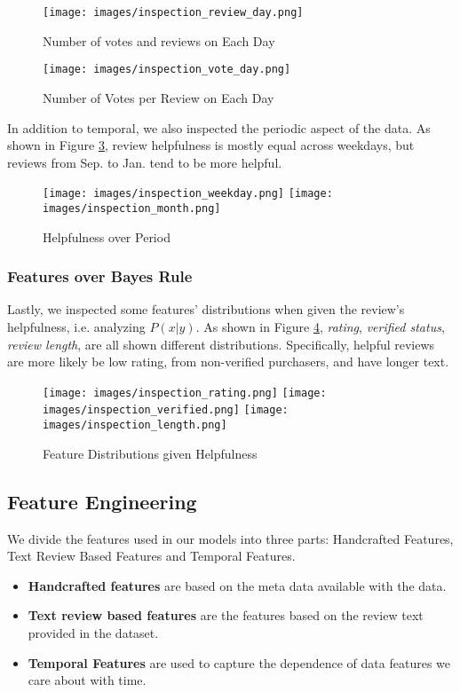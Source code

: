\documentclass[final]{cvpr}
\begin{document}
\begin{figure}[h]
\texttt{[image: images/inspection\_review\_day.png]}
\caption{Number of votes and reviews on Each Day}
\label{fig:inspection_review_day}
\end{figure}

\begin{figure}[h]
\texttt{[image: images/inspection\_vote\_day.png]}
\caption{Number of Votes per Review on Each Day}
\label{fig:inspection_vote_day}
\end{figure}

In addition to temporal, we also inspected the periodic aspect of the data. As shown in Figure \ref{fig:inspection_weekday}, review helpfulness is mostly equal across weekdays, but
reviews from Sep. to Jan. tend to be more helpful.

\begin{figure}[h]
\texttt{[image: images/inspection\_weekday.png]}
\texttt{[image: images/inspection\_month.png]}
\caption{Helpfulness over Period}
\label{fig:inspection_weekday}
\end{figure}


\subsubsection{Features over Bayes Rule}
Lastly, we inspected some features' distributions when given the review's helpfulness, i.e. analyzing $P(x|y)$.
As shown in Figure \ref{fig:bayse_feature}, \textit{rating}, \textit{verified status}, \textit{review length}, are all shown different distributions. Specifically, helpful reviews are more likely be low rating, from non-verified purchasers, and have longer text.

\begin{figure}[h]
\texttt{[image: images/inspection\_rating.png]}
\texttt{[image: images/inspection\_verified.png]}
\texttt{[image: images/inspection\_length.png]}
\caption{Feature Distributions given Helpfulness}
\label{fig:bayse_feature}
\end{figure}



\subsection{Feature Engineering}
We divide the features used in our models into three parts: Handcrafted Features, Text Review Based Features and Temporal Features. \\
\begin{itemize}
    \item \textbf{Handcrafted features} are based on the meta data available with the data.
    \item \textbf{Text review based features} are the features based on the review text provided in the dataset. 
    \item \textbf{Temporal Features} are used to capture the dependence of data features we care about with time.
\end{itemize}
\end{document}
